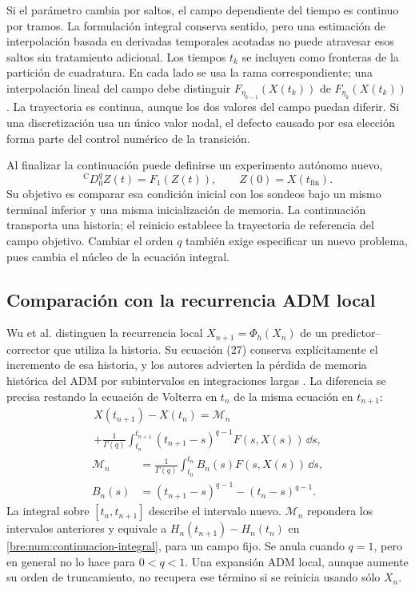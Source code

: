 Si el parámetro cambia por saltos, el campo dependiente del tiempo es
continuo por tramos. La formulación integral conserva sentido, pero una
estimación de interpolación basada en derivadas temporales acotadas no puede
atravesar esos saltos sin tratamiento adicional. Los tiempos \(t_k\) se
incluyen como fronteras de la partición de cuadratura. En cada lado se usa la
rama correspondiente; una interpolación lineal del campo debe distinguir
\(F_{\eta_{k-1}}(X(t_k))\) de \(F_{\eta_k}(X(t_k))\). La trayectoria es
continua, aunque los dos valores del campo puedan diferir. Si una
discretización usa un único valor nodal, el defecto causado por esa elección
forma parte del control numérico de la transición.

Al finalizar la continuación puede definirse un experimento autónomo nuevo,
\[
 {}^{\mathrm C}D_0^q Z(t)=F_1(Z(t)),\qquad Z(0)=X(t_{\mathrm{fin}}).
\]
Su objetivo es comparar esa condición inicial con los sondeos bajo un mismo
terminal inferior y una misma inicialización de memoria. La continuación
transporta una historia; el reinicio establece la trayectoria de referencia
del campo objetivo. Cambiar el orden $q$ también exige especificar un nuevo
problema, pues cambia el núcleo de la ecuación integral.

\subsection{Comparación con la recurrencia ADM local}
\label{bre:num:adm-local}

Wu et al. distinguen la recurrencia local \(X_{n+1}=\Phi_h(X_n)\) de un
predictor--corrector que utiliza la historia. Su ecuación (27) conserva
explícitamente el incremento de esa historia, y los autores advierten la
pérdida de memoria histórica del ADM por subintervalos en integraciones
largas \cite{Wu2023ArctanChua}. La diferencia se precisa restando la ecuación
de Volterra en \(t_n\) de la misma ecuación en \(t_{n+1}\):
\begin{multline}
 X(t_{n+1})-X(t_n)=\mathcal M_n\\
 +\frac1{\Gamma(q)}\int_{t_n}^{t_{n+1}}
 (t_{n+1}-s)^{q-1}F(s,X(s))\,\dd s,
 \label{bre:num:incremento-exacto}
\end{multline}
\begin{equation}
 \begin{split}
 \mathcal M_n&=\frac1{\Gamma(q)}\int_{t_0}^{t_n}B_n(s)F(s,X(s))\,\dd s,\\
 B_n(s)&=(t_{n+1}-s)^{q-1}-(t_n-s)^{q-1}.
 \end{split}
 \label{bre:num:incremento-memoria}
\end{equation}
La integral sobre $[t_n,t_{n+1}]$ describe el intervalo nuevo.
$\mathcal M_n$ repondera los intervalos anteriores y equivale a
\(H_n(t_{n+1})-H_n(t_n)\) en
\eqref{bre:num:continuacion-integral}, para un campo fijo. Se anula cuando
\(q=1\), pero en general no lo hace para \(0<q<1\). Una expansión ADM
local, aunque aumente su orden de truncamiento, no recupera ese término si
se reinicia usando sólo \(X_n\).

